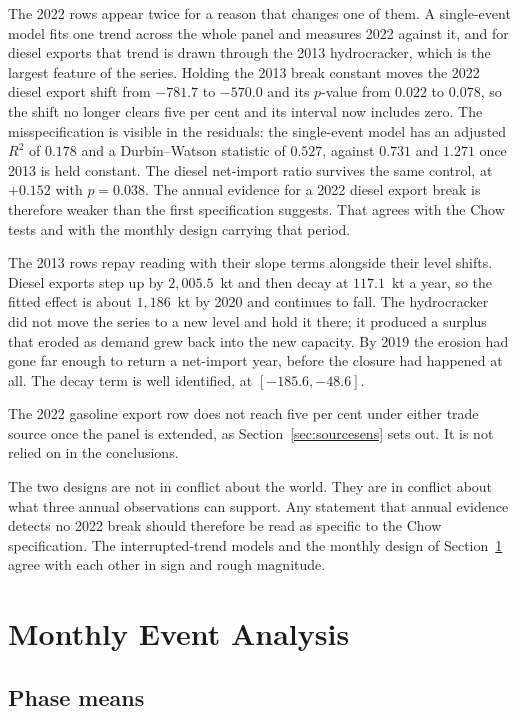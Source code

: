 \documentclass[11pt,a4paper]{article}
\begin{document}
The 2022 rows appear twice for a reason that changes one of them. A single-event model fits one
trend across the whole panel and measures 2022 against it, and for diesel exports that trend is
drawn through the 2013 hydrocracker, which is the largest feature of the series. Holding the
2013 break constant moves the 2022 diesel export shift from $-781.7$ to $-570.0$ and its
$p$-value from $0.022$ to $0.078$, so the shift no longer clears five per cent and its interval
now includes zero. The misspecification is visible in the residuals: the single-event model has
an adjusted $R^2$ of $0.178$ and a Durbin--Watson statistic of $0.527$, against $0.731$ and
$1.271$ once 2013 is held constant. The diesel net-import ratio survives the same control, at
$+0.152$ with $p=0.038$. The annual evidence for a 2022 diesel export break is therefore weaker
than the first specification suggests. That agrees with the Chow tests and with the monthly
design carrying that period.

The 2013 rows repay reading with their slope terms alongside their level shifts. Diesel exports
step up by $2{,}005.5$~kt and then decay at $117.1$~kt a year, so the fitted effect is about
$1{,}186$~kt by 2020 and continues to fall. The hydrocracker did not move the series to a new
level and hold it there; it produced a surplus that eroded as demand grew back into the new
capacity. By 2019 the erosion had gone far enough to return a net-import year, before the
closure had happened at all. The decay term is well identified, at $[-185.6, -48.6]$.

The 2022 gasoline export row does not reach five per cent under either trade source once the
panel is extended, as Section~\ref{sec:sourcesens} sets out. It is
not relied on in the conclusions.

The two designs are not in conflict about the world. They are in conflict about what three annual
observations can support. Any statement that annual evidence detects no 2022 break should
therefore be read as specific to the Chow specification. The interrupted-trend models and the
monthly design of Section~\ref{sec:monthly} agree with each other in sign and rough magnitude.

\section{Monthly Event Analysis}
\label{sec:monthly}

\subsection{Phase means}
\end{document}
